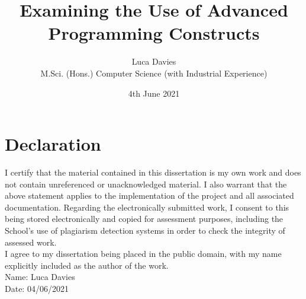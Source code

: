 \documentclass{article}
\title{\textbf{Examining the Use of Advanced Programming Constructs}}
\author{
Luca Davies \\ M.Sci. (Hons.) Computer Science (with Industrial Experience)}
\date{4th June 2021}
\def\frontmatter{%
    \pagenumbering{roman}
    \setcounter{page}{1}
    \renewcommand{\thesection}{\roman{section}}
}%
\begin{document}
\maketitle

\frontmatter

\newpage
\section*{Declaration}
    I certify that the material contained in this dissertation is my own work and does not contain unreferenced or unacknowledged material. I also warrant that the above statement applies to the implementation of the project and all associated documentation. Regarding the electronically submitted work, I consent to this being stored electronically and copied for assessment purposes, including the School’s use of plagiarism detection systems in order to check the integrity of assessed work. \\
    I agree to my dissertation being placed in the public domain, with my name explicitly included as the author of the work. \\
    
    \noindent
    Name: Luca Davies\\
    Date: 04/06/2021
\newpage
\end{document}
